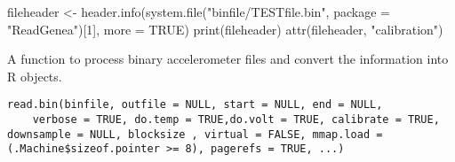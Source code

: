 \documentclass[a4paper]{book}
\begin{document}
%
\begin{SeeAlso}\relax
{}
\end{SeeAlso}
%
\begin{Examples}
\begin{ExampleCode}

fileheader <- header.info(system.file("binfile/TESTfile.bin", package = "ReadGenea")[1], more = TRUE)
print(fileheader)
attr(fileheader, "calibration")
\end{ExampleCode}
\end{Examples}
%
\begin{Description}\relax
A function to process binary accelerometer files and convert the information into R objects.
\end{Description}
%
\begin{Usage}
\begin{verbatim}
read.bin(binfile, outfile = NULL, start = NULL, end = NULL, 
    verbose = TRUE, do.temp = TRUE,do.volt = TRUE, calibrate = TRUE, downsample = NULL, blocksize , virtual = FALSE, mmap.load = (.Machine$sizeof.pointer >= 8), pagerefs = TRUE, ...)
\end{verbatim}
\end{Usage}
%
\end{document}
